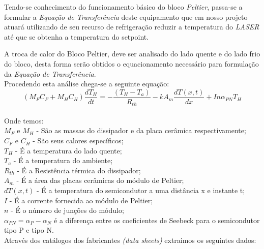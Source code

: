 Tendo-se conhecimento do funcionamento básico do bloco \emph{Peltier}, passa-se a formular a \emph{Equação de Transferência} deste equipamento que em nosso projeto atuará utilizando de seu recurso de refrigeração reduzir a temperatura do \emph{LASER} até que se obtenha a temperatura do setpoint.

A troca de calor do Bloco Peltier, deve ser analisado do lado quente e do lado frio do bloco, desta forma serão obtidos o equacionamento necessário para formulação da \emph{Equação de Transferência}. \\

Procedendo esta análise chega-se a seguinte equação:\\

\[\left ( M_{F}C_{F} + M_{H}C_{H}\right )\frac{dT_{H}}{dt}= -\frac{\left ( T_{H}- T_{a} \right )}{R_{th}} - kA_{m} \frac{dT(x,t)}{dx} + I n \alpha_{PN} T_{H}\] \\

Onde temos:\\
$M_{F}$ e $M_{H} $ - São as massas do dissipador e da placa cerâmica respectivamente;\\
$ C_{F} $ e $ C_{H} $ - São seus calores específicos;\\
$ T_{H} $ - É a temperatura do lado quente;\\
$ T_{a} $ - É a temperatura do ambiente;\\
$ R_{th} $ - É a Resistência térmica do dissipador;\\
$A_{m} $ - É a área das placas cerâmicas do módulo de Peltier;\\
$ dT(x,t) $ - É a temperatura do semicondutor a uma distância x e instante t;\\
$ I $ - É a corrente fornecida ao módulo de Peltier;\\
$ n $ - É o número de junções do módulo;\\
$ \alpha_{PN} = \alpha_{P} - \alpha_{N}$ é a diferença entre os coeficientes de Seebeck para o semicondutor tipo P e tipo N. \\

Através dos catálogos dos fabricantes \emph{(data sheets)} extraimos os seguintes dados:

